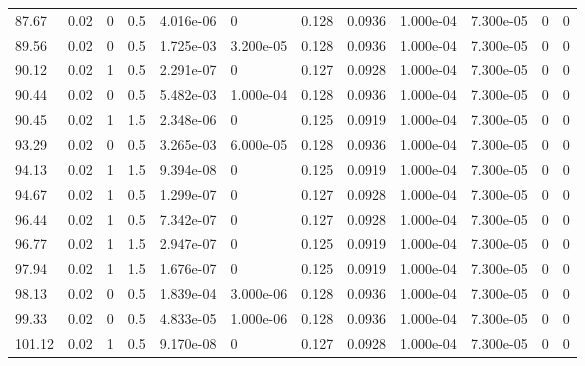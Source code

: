 \documentclass[preview]{standalone}
\begin{document}
{{{\begin{tabular}{L{1.2cm}C{1.2cm} C{0.3cm}C{0.5cm} C{1.4cm}C{1.4cm} C{1.4cm}C{1.4cm} C{1.6cm}C{1.6cm} C{1.6cm}C{1.6cm}}
  87.67  &  0.02  & 0     & 0.5 &  4.016e-06  & 0  &  0.128&   0.0936& 1.000e-04 & 7.300e-05   &  0 & 0  \\ 
  89.56  &  0.02  & 0     & 0.5 &  1.725e-03  & 3.200e-05  &  0.128&   0.0936& 1.000e-04 & 7.300e-05   &  0 & 0  \\ 
  90.12  &  0.02  & 1     & 0.5 &  2.291e-07  & 0  &  0.127&   0.0928& 1.000e-04 & 7.300e-05   &  0 & 0  \\ 
  90.44  &  0.02  & 0     & 0.5 &  5.482e-03  & 1.000e-04  &  0.128&   0.0936& 1.000e-04 & 7.300e-05   &  0 & 0  \\ 
  90.45  &  0.02  & 1     & 1.5 &  2.348e-06  & 0  &  0.125&   0.0919& 1.000e-04 & 7.300e-05   &  0 & 0  \\ 
  93.29  &  0.02  & 0     & 0.5 &  3.265e-03  & 6.000e-05  &  0.128&   0.0936& 1.000e-04 & 7.300e-05   &  0 & 0  \\ 
  94.13  &  0.02  & 1     & 1.5 &  9.394e-08  & 0  &  0.125&   0.0919& 1.000e-04 & 7.300e-05   &  0 & 0  \\ 
  94.67  &  0.02  & 1     & 0.5 &  1.299e-07  & 0  &  0.127&   0.0928& 1.000e-04 & 7.300e-05   &  0 & 0  \\ 
  96.44  &  0.02  & 1     & 0.5 &  7.342e-07  & 0  &  0.127&   0.0928& 1.000e-04 & 7.300e-05   &  0 & 0  \\ 
  96.77  &  0.02  & 1     & 1.5 &  2.947e-07  & 0  &  0.125&   0.0919& 1.000e-04 & 7.300e-05   &  0 & 0  \\ 
  97.94  &  0.02  & 1     & 1.5 &  1.676e-07  & 0  &  0.125&   0.0919& 1.000e-04 & 7.300e-05   &  0 & 0  \\ 
  98.13  &  0.02  & 0     & 0.5 &  1.839e-04  & 3.000e-06  &  0.128&   0.0936& 1.000e-04 & 7.300e-05   &  0 & 0  \\ 
  99.33  &  0.02  & 0     & 0.5 &  4.833e-05  & 1.000e-06  &  0.128&   0.0936& 1.000e-04 & 7.300e-05   &  0 & 0  \\ 
  101.12  &  0.02  & 1     & 0.5 &  9.170e-08  & 0  &  0.127&   0.0928& 1.000e-04 & 7.300e-05   &  0 & 0  \\ 
\hline 
\end{tabular} 

}}}
\end{document}
